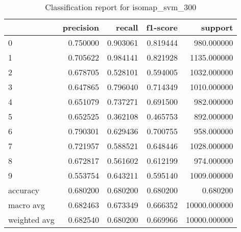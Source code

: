 \begin{table}[htb!]
\centering
\caption{Classification report for isomap_svm_300}
\label{tab:classification-report-isomap_svm_300}
\begin{tabular}{lrrrr}
\toprule
 & precision & recall & f1-score & support \\
\midrule
0 & 0.750000 & 0.903061 & 0.819444 & 980.000000 \\
1 & 0.705622 & 0.984141 & 0.821928 & 1135.000000 \\
2 & 0.678705 & 0.528101 & 0.594005 & 1032.000000 \\
3 & 0.647865 & 0.796040 & 0.714349 & 1010.000000 \\
4 & 0.651079 & 0.737271 & 0.691500 & 982.000000 \\
5 & 0.652525 & 0.362108 & 0.465753 & 892.000000 \\
6 & 0.790301 & 0.629436 & 0.700755 & 958.000000 \\
7 & 0.721957 & 0.588521 & 0.648446 & 1028.000000 \\
8 & 0.672817 & 0.561602 & 0.612199 & 974.000000 \\
9 & 0.553754 & 0.643211 & 0.595140 & 1009.000000 \\
accuracy & 0.680200 & 0.680200 & 0.680200 & 0.680200 \\
macro avg & 0.682463 & 0.673349 & 0.666352 & 10000.000000 \\
weighted avg & 0.682540 & 0.680200 & 0.669966 & 10000.000000 \\
\bottomrule
\end{tabular}
\end{table}
